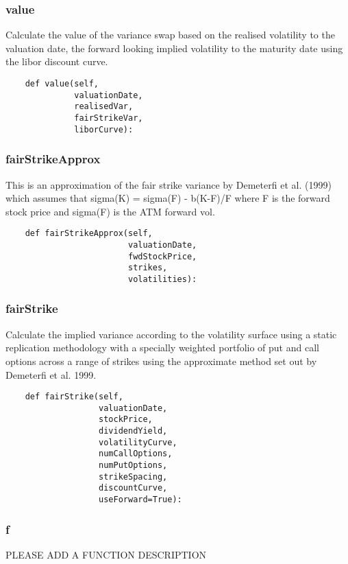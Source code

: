 \documentclass[twoside,11pt]{book}
\begin{document}
\subsubsection*{{\bf value}}
Calculate the value of the variance swap based on the realised volatility to the valuation date, the forward looking implied volatility to the maturity date using the libor discount curve.  

\begin{lstlisting}
    def value(self,
              valuationDate,
              realisedVar,
              fairStrikeVar,
              liborCurve):
\end{lstlisting}

\subsubsection*{{\bf fairStrikeApprox}}
This is an approximation of the fair strike variance by Demeterfi et al. (1999) which assumes that sigma(K) = sigma(F) - b(K-F)/F where F is the forward stock price and sigma(F) is the ATM forward vol.  

\begin{lstlisting}
    def fairStrikeApprox(self,
                         valuationDate,
                         fwdStockPrice,
                         strikes,
                         volatilities):
\end{lstlisting}

\subsubsection*{{\bf fairStrike}}
Calculate the implied variance according to the volatility surface using a static replication methodology with a specially weighted portfolio of put and call options across a range of strikes using the approximate method set out by Demeterfi et al. 1999.  

\begin{lstlisting}
    def fairStrike(self,
                   valuationDate,
                   stockPrice,
                   dividendYield,
                   volatilityCurve,
                   numCallOptions,
                   numPutOptions,
                   strikeSpacing,
                   discountCurve,
                   useForward=True):
\end{lstlisting}

\subsubsection*{{\bf f}}
PLEASE ADD A FUNCTION DESCRIPTION
\end{document}
